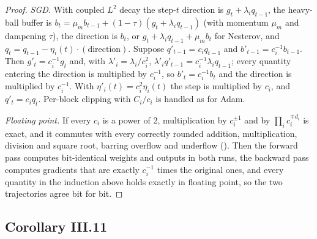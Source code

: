 \begin{proof}
\emph{SGD.} With coupled $L^2$ decay the step-$t$ direction is $g_t+\lambda_iq_{t-1}$, the heavy-ball buffer is
$b_t=\mu_mb_{t-1}+(1-\tau)(g_t+\lambda_iq_{t-1})$ (with momentum $\mu_m$ and dampening $\tau$), the direction is $b_t$, or
$g_t+\lambda_iq_{t-1}+\mu_mb_t$ for Nesterov, and $q_t=q_{t-1}-\eta_i(t)\cdot(\text{direction})$. Suppose $q'_{t-1}=c_iq_{t-1}$
and $b'_{t-1}=c_i^{-1}b_{t-1}$. Then $g'_t=c_i^{-1}g_t$ and, with $\lambda'_i=\lambda_i/c_i^2$,
$\lambda'_iq'_{t-1}=c_i^{-1}\lambda_iq_{t-1}$; every quantity entering the direction is multiplied by $c_i^{-1}$, so
$b'_t=c_i^{-1}b_t$ and the direction is multiplied by $c_i^{-1}$. With $\eta'_i(t)=c_i^2\eta_i(t)$ the step is multiplied by
$c_i$, and $q'_t=c_iq_t$. Per-block clipping with $C_i/c_i$ is handled as for Adam.

\emph{Floating point.} If every $c_i$ is a power of $2$, multiplication by $c_i^{\pm1}$ and by $\prod_ic_i^{\mp d_i}$ is
exact, and it commutes with every correctly rounded addition, multiplication, division and square root, barring overflow
and underflow (). Then the forward pass computes bit-identical weights and outputs in both
runs, the backward pass computes gradients that are exactly $c_i^{-1}$ times the original ones, and every quantity in the
induction above holds exactly in floating point, so the two trajectories agree bit for bit.
\end{proof}

\subsection{Corollary III.11}\label{proof:III.11}

